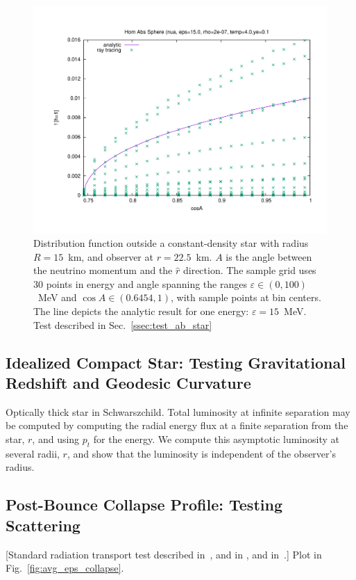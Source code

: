 \documentclass[aps,floatfix,prd,superscriptaddress,twocolumn]{revtex4-1}
\newcommand{\todo}[1]{\marginpar{\tiny{\textcolor{red}{#1}}}}
\begin{document}
\begin{figure}
  \includegraphics[width=\columnwidth]{fig-absorption_sphere}
  \caption{Distribution function outside a constant-density star
    with radius $R=15$~km, and observer at $r=22.5$~km.
    $A$ is the angle between the neutrino momentum and the $\hat{r}$ direction.
    The sample grid uses 30 points in energy and angle spanning the ranges
    $\varepsilon\in(0,100)$~MeV and $\cos A\in(0.6454,1)$,
    with sample points at bin centers.
    The line depicts the analytic result for one energy: $\varepsilon=15$~MeV.
    Test described in Sec.~\ref{ssec:test_ab_star}}
  \label{fig:f_absorption_sphere}
\end{figure}

\subsection{Idealized Compact Star:
  Testing Gravitational Redshift and Geodesic Curvature}
\label{ssec:test_gravity}
Optically thick star in Schwarszchild.
Total luminosity at infinite separation may be computed by
computing the radial energy flux at a finite separation from the star, $r$,
and using $p_t$ for the energy. We compute this asymptotic luminosity
at several radii, $r$, and show that the luminosity is independent of
the observer's radius.
\todo{compute $L$, put in figure}

\subsection{Post-Bounce Collapse Profile:
  Testing Scattering}
\label{ssec:test_collapse}
[Standard radiation transport test described in~\cite{ocon2015-gr1d_with_nu},
and in \cite[App.~E.6]{fouc2015-m1_nsbh},
and in~\cite{abdi2012-monte_carlo}.]
Plot in Fig.~\ref{fig:avg_eps_collapse}.
\end{document}
